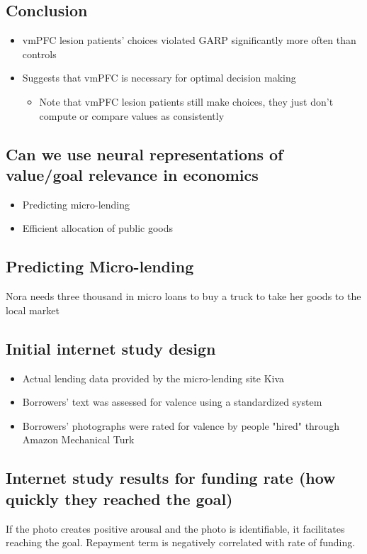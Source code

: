\subsection{Conclusion}
\begin{itemize}
    \item vmPFC lesion patients' choices violated GARP significantly more often than controls
    \item Suggests that vmPFC is necessary for optimal decision making
    \begin{itemize}
        \item Note that vmPFC lesion patients still make choices, they just don't compute or compare values as consistently
    \end{itemize}
\end{itemize}

\subsection{Can we use neural representations of value/goal relevance in economics}
\begin{itemize}
    \item Predicting micro-lending
    \item Efficient allocation of public goods
\end{itemize}
\subsection{Predicting Micro-lending}
Nora needs three thousand in micro loans to buy a truck to take her goods to the local market

\subsection{Initial internet study design}
\begin{itemize}
    \item Actual lending data provided by the micro-lending site Kiva
    \item Borrowers' text was assessed for valence using a standardized system
    \item Borrowers' photographs were rated for valence by people "hired" through Amazon Mechanical Turk
\end{itemize}
\subsection{Internet study results for funding rate (how quickly they reached the goal)}
If the photo creates positive arousal and the photo is identifiable, it facilitates reaching the goal. Repayment term is negatively correlated with rate of funding.
